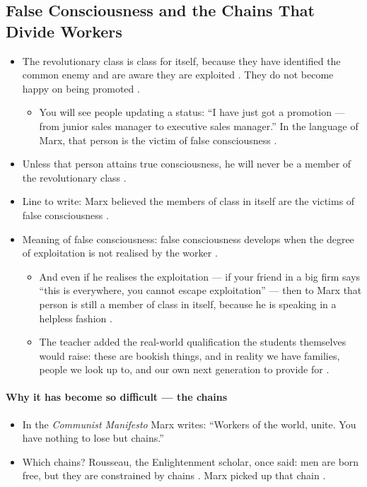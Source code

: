 \subsection{False Consciousness and the Chains That Divide Workers}
\begin{itemize}
    \item The revolutionary class is class for itself, because they have identified the common enemy and are aware they are exploited . They do not become happy on being promoted .
    \begin{itemize}
        \item You will see people updating a status: ``I have just got a promotion --- from junior sales manager to executive sales manager.''  In the language of Marx, that person is the victim of false consciousness .
    \end{itemize}
    \item Unless that person attains true consciousness, he will never be a member of the revolutionary class .
    \item Line to write: Marx believed the members of class in itself are the victims of false consciousness .
    \item Meaning of false consciousness: false consciousness develops when the degree of exploitation is not realised by the worker .
    \begin{itemize}
        \item And even if he realises the exploitation --- if your friend in a big firm says ``this is everywhere, you cannot escape exploitation'' --- then to Marx that person is still a member of class in itself, because he is speaking in a helpless fashion .
        \item The teacher added the real-world qualification the students themselves would raise: these are bookish things, and in reality we have families, people we look up to, and our own next generation to provide for .
    \end{itemize}
\end{itemize}

\paragraph{Why it has become so difficult --- the chains}
\begin{itemize}
    \item In the \emph{Communist Manifesto} Marx writes: ``Workers of the world, unite. You have nothing to lose but chains.'' 
    \item Which chains? Rousseau, the Enlightenment scholar, once said: men are born free, but they are constrained by chains . Marx picked up that chain .
\end{itemize}

